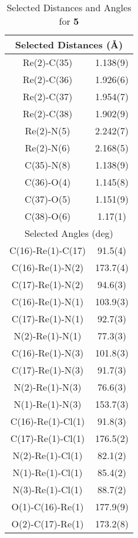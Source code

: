 \begin{table}[htbp]
  \caption{Selected Distances and Angles for \textbf{5}}
  \centering
    \begin{tabular}{cc}
    \toprule
    \multicolumn{2}{c}{Selected Distances (\r{A})} \\
    \midrule
    Re(2)-C(35) & 1.138(9) \\
    Re(2)-C(36) & 1.926(6)\\
    Re(2)-C(37) & 1.954(7) \\
    Re(2)-C(38) & 1.902(9) \\
    Re(2)-N(5) & 2.242(7) \\
    Re(2)-N(6) & 2.168(5) \\
    C(35)-N(8) & 1.138(9) \\
    C(36)-O(4) & 1.145(8) \\
    C(37)-O(5) & 1.151(9) \\
    C(38)-O(6) & 1.17(1) \\ \midrule
    \multicolumn{2}{c}{Selected Angles (deg)} \\ \midrule
    C(16)-Re(1)-C(17) & 91.5(4) \\
    C(16)-Re(1)-N(2) & 173.7(4) \\
    C(17)-Re(1)-N(2) & 94.6(3) \\
    C(16)-Re(1)-N(1) & 103.9(3) \\
    C(17)-Re(1)-N(1) & 92.7(3) \\
    N(2)-Re(1)-N(1) & 77.3(3) \\
    C(16)-Re(1)-N(3) & 101.8(3) \\
    C(17)-Re(1)-N(3) & 91.7(3) \\
    N(2)-Re(1)-N(3) & 76.6(3) \\
    N(1)-Re(1)-N(3) & 153.7(3) \\
    C(16)-Re(1)-Cl(1) & 91.8(3) \\
    C(17)-Re(1)-Cl(1) & 176.5(2) \\
    N(2)-Re(1)-Cl(1) & 82.1(2) \\
    N(1)-Re(1)-Cl(1) & 85.4(2) \\
    N(3)-Re(1)-Cl(1) & 88.7(2) \\
    O(1)-C(16)-Re(1) & 177.9(9) \\
    O(2)-C(17)-Re(1) & 173.2(8) \\
    \bottomrule
    \end{tabular}%
  \label{tab.da5}%
\end{table}%


